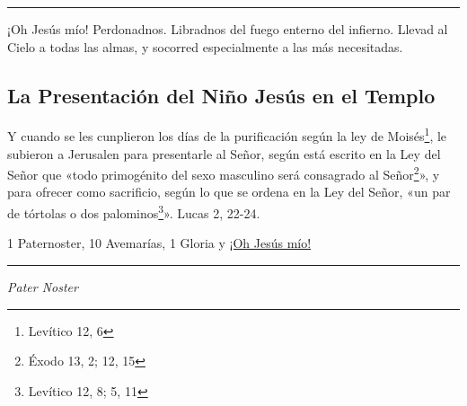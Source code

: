 \documentclass[a4paper,11pt, oneside]{report}
\begin{document}
\begin{center}\rule{1\linewidth}{\linethickness}\end{center}

\hypertarget{finalNatividad}{¡Oh Jesús mío! Perdonadnos. Libradnos del fuego enterno del infierno. Llevad al Cielo a todas las almas, y socorred especialmente a las más 
necesitadas.}

\subsection*{La Presentación del Niño Jesús en el Templo}

Y cuando se les cunplieron los días de la purificación según la ley de Moisés\footnote{Levítico 12, 6}, le subieron a Jerusalen para presentarle al Señor, según está escrito
en la Ley del Señor que «todo primogénito del sexo masculino será consagrado al Señor\footnote{Éxodo 13, 2; 12, 15}», y para ofrecer como sacrificio, según lo que 
se ordena en la Ley del Señor, «un par de tórtolas o dos palominos\footnote{Levítico 12, 8; 5, 11}». Lucas 2, 22-24.

\medskip

1 Paternoster, 10 Avemarías, 1 Gloria y \hyperlink{finalPresentacion}{¡Oh Jesús mío!}

\medskip

\begin{center}\rule{1\linewidth}{2\linethickness}\end{center}

\medskip
\textit{Pater Noster}
\end{document}
